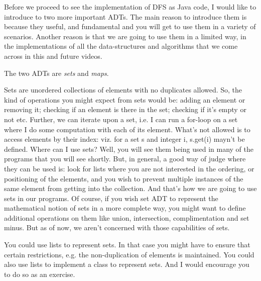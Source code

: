\documentclass[12pt,a4paper]{article}
\begin{document}
Before we proceed to see the implementation of DFS as Java code, I would like to introduce to two more important ADTs. The main reason to introduce them is because they useful, and fundamental and you will get to use them in a variety of scenarios. Another reason is that we are going to use them in a limited way, in the implementations of all the data-structures and algorithms that we come across in this and future videos.

The two ADTs are \emph{sets} and \emph{maps}.

Sets are unordered collections of elements with no duplicates allowed. So, the kind of operations you might expect from sets would be: adding an element or removing it; checking if an element is there in the set; checking if it's empty or not etc. Further, we can iterate upon a set, i.e. I can run a for-loop on a set where I do some computation with each of its element. What's not allowed is to access elements by their index: viz. for a set s and integer i, s.get(i) mayn't be defined. Where can I use sets? Well, you will see them being used in many of the programs that you will see shortly. But, in general, a good way of judge where they can be used is: look for lists where you are not interested in the ordering, or positioning of the elements, and you wish to prevent multiple instances of the same element from getting into the collection. And that's how we are going to use sets in our programs. Of course, if you wish set ADT to represent the mathematical notion of sets in a more complete way, you might want to define additional operations on them like union, intersection, complimentation and set minus. But as of now, we aren't concerned with those capabilities of sets.

You could use lists to represent sets. In that case you might have to ensure that certain restrictions, e.g. the non-duplication of elements is maintained. You could also use lists to implement a class to represent sets. And I would encourage you to do so as an exercise.
\end{document}
